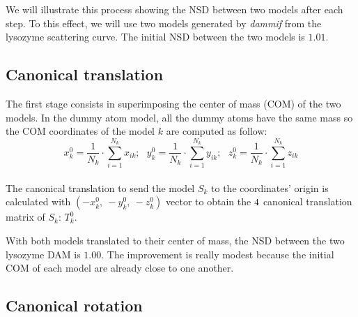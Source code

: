 \documentclass[a4paper, 11pt]{report}
\begin{document}
We will illustrate this process showing the NSD between two models 
after each step. 
To this effect, we will use two models generated by \textit{dammif} 
from the lysozyme scattering curve. 
The initial NSD between the two models is $1.01$.

\subsection{Canonical translation}

The first stage consists in superimposing the center of mass (COM) of 
the two models. 
In the dummy atom model, all the dummy atoms have the same mass so the 
COM coordinates of the model $k$ are computed as follow:
\[
x_{k}^0 = \frac{1}{N_{k}} \cdot \sum\limits_{i=1}^{N_{k}} x_{ik};\ \ \ 
y_{k}^0 = \frac{1}{N_{k}} \cdot \sum\limits_{i=1}^{N_{k}} y_{ik};\ \ \ 
z_{k}^0 = \frac{1}{N_{k}} \cdot \sum\limits_{i=1}^{N_{k}} z_{ik}
\]\\
The canonical translation to send the model $S_{k}$ to the coordinates' 
origin is calculated with $(-x_{k}^0,\ -y_{k}^0,\ -z_{k}^0)$ vector to 
obtain the $4 \time 4$ canonical translation matrix of $S_{k}$: 
$T_{k}^0$.

With both models translated to their center of mass, the NSD between 
the two lysozyme DAM is $1.00$. 
The improvement is really modest because the initial COM of each model 
are already close to one another.

\subsection{Canonical rotation}
\end{document}
